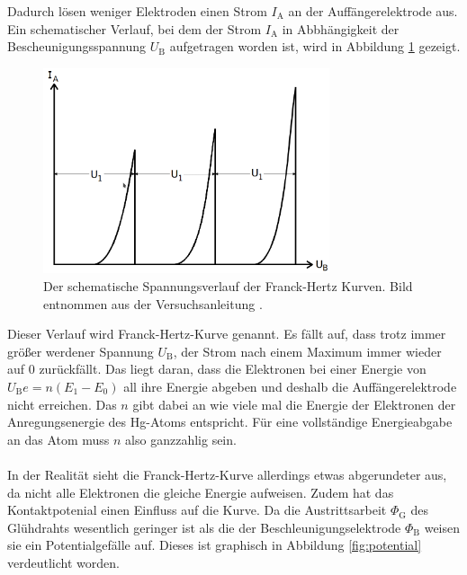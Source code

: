 Dadurch lösen weniger Elektroden einen Strom $I_\text{A}$ an der Auffängerelektrode aus.
Ein schematischer Verlauf, bei dem der Strom $I_\text{A}$ in Abbhängigkeit der Bescheunigungsspannung $U_\text{B}$ aufgetragen worden ist, wird in Abbildung \ref{fig:spannungsverlauf} gezeigt.
\begin{figure}
    \centering
    \includegraphics[width=0.75\textwidth]{content/data/Spannungsverlauf.png}
    \caption{Der schematische Spannungsverlauf der Franck-Hertz Kurven. Bild entnommen aus der Versuchsanleitung \cite[4]{anleitung}.}
    \label{fig:spannungsverlauf}
\end{figure}
Dieser Verlauf wird Franck-Hertz-Kurve genannt.
Es fällt auf, dass trotz immer größer werdener Spannung $U_\text{B}$, der Strom nach einem Maximum immer wieder auf 0 zurückfällt.
Das liegt daran, dass die Elektronen bei einer Energie von $U_\text{B} e = n(E_1 - E_0)$ all ihre Energie abgeben und deshalb die Auffängerelektrode nicht erreichen.
Das $n$ gibt dabei an wie viele mal die Energie der Elektronen der Anregungsenergie des Hg-Atoms entspricht.
Für eine vollständige Energieabgabe an das Atom muss $n$ also ganzzahlig sein.
\\\\
In der Realität sieht die Franck-Hertz-Kurve allerdings etwas abgerundeter aus, da nicht alle Elektronen die gleiche Energie aufweisen.
Zudem hat das Kontaktpotenial einen Einfluss auf die Kurve.
Da die Austrittsarbeit $\Phi_\text{G}$ des Glühdrahts wesentlich geringer ist als die der Beschleunigungselektrode $\Phi_\text{B}$ weisen sie ein Potentialgefälle auf.
Dieses ist graphisch in Abbildung \ref{fig:potential} verdeutlicht worden.
